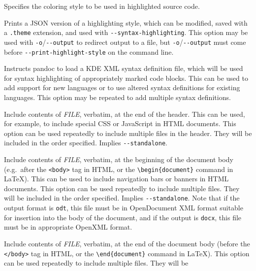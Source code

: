 \documentclass[
]{article}
\begin{document}
\begin{description}
Specifies the coloring style to be used in highlighted source code.
\item[\texttt{-\/-print-highlight-style=}\emph{STYLE}\textbar{}\emph{FILE}]
Prints a JSON version of a highlighting style, which can be modified,
saved with a \texttt{.theme} extension, and used with
\texttt{-\/-syntax-highlighting}. This option may be used with
\texttt{-o}/\texttt{-\/-output} to redirect output to a file, but
\texttt{-o}/\texttt{-\/-output} must come before
\texttt{-\/-print-highlight-style} on the command line.
\item[\texttt{-\/-syntax-definition=}\emph{FILE}]
Instructs pandoc to load a KDE XML syntax definition file, which will be
used for syntax highlighting of appropriately marked code blocks. This
can be used to add support for new languages or to use altered syntax
definitions for existing languages. This option may be repeated to add
multiple syntax definitions.
\item[\texttt{-H} \emph{FILE},
\texttt{-\/-include-in-header=}\emph{FILE}\textbar{}\emph{URL}]
Include contents of \emph{FILE}, verbatim, at the end of the header.
This can be used, for example, to include special CSS or JavaScript in
HTML documents. This option can be used repeatedly to include multiple
files in the header. They will be included in the order specified.
Implies \texttt{-\/-standalone}.
\item[\texttt{-B} \emph{FILE},
\texttt{-\/-include-before-body=}\emph{FILE}\textbar{}\emph{URL}]
Include contents of \emph{FILE}, verbatim, at the beginning of the
document body (e.g.~after the \texttt{\textless{}body\textgreater{}} tag
in HTML, or the \texttt{\textbackslash{}begin\{document\}} command in
LaTeX). This can be used to include navigation bars or banners in HTML
documents. This option can be used repeatedly to include multiple files.
They will be included in the order specified. Implies
\texttt{-\/-standalone}. Note that if the output format is \texttt{odt},
this file must be in OpenDocument XML format suitable for insertion into
the body of the document, and if the output is \texttt{docx}, this file
must be in appropriate OpenXML format.
\item[\texttt{-A} \emph{FILE},
\texttt{-\/-include-after-body=}\emph{FILE}\textbar{}\emph{URL}]
Include contents of \emph{FILE}, verbatim, at the end of the document
body (before the \texttt{\textless{}/body\textgreater{}} tag in HTML, or
the \texttt{\textbackslash{}end\{document\}} command in LaTeX). This
option can be used repeatedly to include multiple files. They will be

\end{description}
\end{document}
